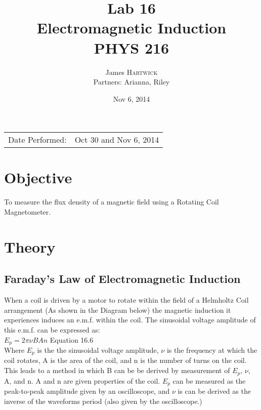 \documentclass{article}
\title{Lab 16 \\ Electromagnetic Induction \\ PHYS 216} %
\author{James \textsc{Hartwick}\\Partners: Arianna, Riley} %
\date{Nov 6, 2014} %
\begin{document}
\maketitle %

\begin{center}
\begin{tabular}{l r}
Date Performed: & Oct 30 and Nov 6, 2014 \\ %
\end{tabular}
\end{center}



\section{Objective}
To measure the flux density of a magnetic field using a Rotating Coil Magnetometer.
\section{Theory}
\subsection{Faraday's Law of Electromagnetic Induction}
When a coil is driven by a motor to rotate within the field of a Helmholtz Coil arrangement (As shown in the Diagram below) the magnetic induction it experiences induces an e.m.f. within the coil. The sinusoidal voltage amplitude of this e.m.f. can be expressed as:\\
$E_p=2\pi\nu BAn$ Equation 16.6\\

Where $E_p$ is the the sinusoidal voltage amplitude, $\nu$ is the frequency at which the coil rotates, A is the area of the coil, and n is the number of turns on the coil. This leads to a method in which B can be be derived by measurement of $E_p$, $\nu$, A, and n. A and n are given properties of the coil. $E_p$ can be measured as the peak-to-peak amplitude given by an oscilloscope, and $\nu$ is can be derived as the inverse of the waveforms period (also given by the oscilloscope.)\\
\end{document}

